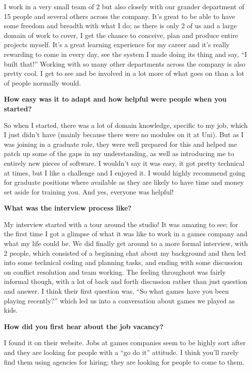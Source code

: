 \documentclass{scrartcl}
\begin{document}
\begin{itemize}
\begin{itemize}
\begin{appendices}
\par
I work in a very small team of 2 but also closely with our grander department of 15 people and several others across the company. It’s great to be able to have some freedom and breadth with what I do; as there is only 2 of us and a large domain of work to cover, I get the chance to conceive, plan and produce entire projects myself. It’s a great learning experience for my career and it’s really rewarding to come in every day, see the system I made doing its thing and say, “I built that!”
Working with so many other departments across the company is also pretty cool. I get to see and be involved in a lot more of what goes on than a lot of people normally would. 
\par
\textbf{How easy was it to adapt and how helpful were people when you started?}
\par
So when I started, there was a lot of domain knowledge, specific to my job, which I just didn’t have (mainly because there were no modules on it at Uni). But as I was joining in a graduate role, they were well prepared for this and helped me patch up some of the gaps in my understanding, as well as introducing me to entirely new pieces of software. I wouldn’t say it was easy, it got pretty technical at times, but I like a challenge and I enjoyed it. I would highly recommend going for graduate positions where available as they are likely to have time and money set aside for training you. 
And yes, everyone was helpful!
\par
\textbf{What was the interview process like?}
\par
My interview started with a tour around the studio! It was amazing to see; for the first time I got a glimpse of what it was like to work in a games company and what my life could be. We did finally get around to a more formal interview, with 2 people, which consisted of a beginning chat about my background and then led into some technical coding and planning tasks, and ending with some discussion on conflict resolution and team working. 
The feeling throughout was fairly informal though, with a lot of back and forth discussion rather than just question and answer. I think their first question was, “So what games have you been playing recently?” which led us into a conversation about games we played as kids.
\par
\textbf{How did you first hear about the job vacancy?}
\par
I found it on their website. Jobs at games companies seem to be highly sort after and they are looking for people with a “go do it” attitude. I think you’ll rarely find them using agencies for hiring; they are looking for people to come to them.

\end{appendices}
\end{itemize}
\end{itemize}
\end{document}
